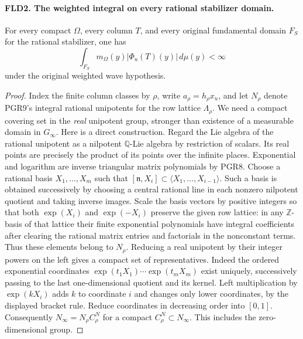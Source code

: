 \paragraph{FLD2. The weighted integral on every rational stabilizer domain.}
\label{claim:FLD2}
For every compact $\Omega$, every column $T$, and every original
fundamental domain $F_S$ for the rational stabilizer, one has
\[
             \int_{F_S}m_\Omega(y)|\Phi_u(T)(y)|\,d\mu(y)<\infty
\]
under the original weighted wave hypothesis.

\begin{proof}
Index the finite column classes by $\rho$, write $a_\rho=h_\rho x_u$,
and let $N_\rho$ denote PGR9's integral rational unipotents for the
row lattice $\Lambda_\rho$. We need a compact covering set in the
\emph{real} unipotent group, stronger than existence of a measurable
domain in $G_\infty$. Here is a direct construction. Regard the
Lie algebra of the rational unipotent as a nilpotent $\mathbb Q$-Lie
algebra by restriction of scalars. Its real points are precisely the
product of its points over the infinite places. Exponential and
logarithm are inverse triangular matrix polynomials by PGR8.
Choose a rational basis $X_1,\ldots,X_m$ such that
$[\mathfrak n,X_i]\subset\langle X_1,\ldots,X_{i-1}\rangle$.
Such a basis is obtained successively by choosing a central rational
line in each nonzero nilpotent quotient and taking inverse images.
Scale the basis vectors by positive integers so that both
$\exp(X_i)$ and $\exp(-X_i)$ preserve the given row lattice:
in any $\mathbb Z$-basis of that lattice their finite exponential
polynomials have integral coefficients after clearing the rational
matrix entries and factorials in the nonconstant terms. Thus these
elements belong to $N_\rho$. Reducing a real unipotent by their
integer powers on the left gives a compact set of representatives.
Indeed the ordered exponential coordinates
$\exp(t_1X_1)\cdots\exp(t_mX_m)$ exist uniquely, successively
passing to the last one-dimensional quotient and its kernel.
Left multiplication by $\exp(kX_i)$ adds $k$ to coordinate $i$
and changes only lower coordinates, by the displayed bracket rule.
Reduce coordinates in decreasing order into $[0,1]$. Consequently
$N_\infty=N_\rho C_\rho^N$ for a compact $C_\rho^N\subset N_\infty$.
This includes the zero-dimensional group.


\end{proof}
